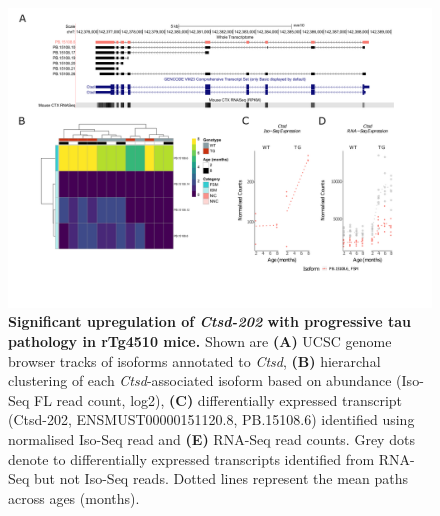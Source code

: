\begin{landscape}
	\begin{figure}[!htp]
		\centering
		\includegraphics[page=1,trim={1.5cm 2.5cm 2cm 2cm}, scale = 0.85]{Figures/Ch5_DiffPlots_Landscape.pdf}
		\captionsetup{width=1.5\textwidth}
		\caption[Differential \textit{Ctsd} transcript expression]%
		{\textbf{Significant upregulation of \textit{Ctsd-202} with progressive tau pathology in rTg4510 mice.} Shown are \textbf{(A)} UCSC genome browser tracks of isoforms annotated to \textit{Ctsd}, \textbf{(B)} hierarchal clustering of each \textit{Ctsd}-associated isoform based on abundance (Iso-Seq FL read count, log2), \textbf{(C)} differentially expressed transcript (Ctsd-202, ENSMUST00000151120.8, PB.15108.6) identified using normalised Iso-Seq read and \textbf{(E)} RNA-Seq read counts. Grey dots denote to differentially expressed transcripts identified from RNA-Seq but not Iso-Seq reads. Dotted lines represent the mean paths across ages (months).}   
		\label{fig:Ctsd}
	\end{figure}	
\end{landscape}

